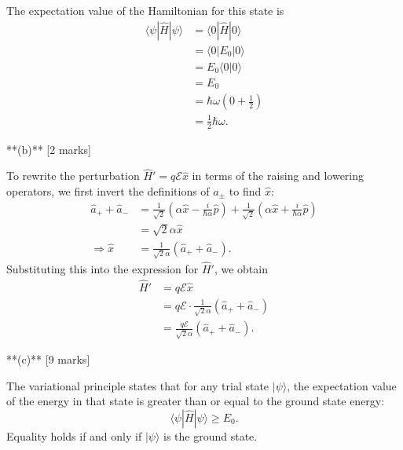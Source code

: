 \documentclass{article}
\begin{document}
The expectation value of the Hamiltonian for this state is
\begin{align*}
\langle \psi | \hat{H} | \psi \rangle &= \langle 0 | \hat{H} | 0 \rangle \\
&= \langle 0 | E_0 | 0 \rangle \\
&= E_0 \langle 0 | 0 \rangle \\
&= E_0 \\
&= \hbar \omega \left( 0 + \frac{1}{2} \right) \\
&= \frac{1}{2} \hbar \omega.
\end{align*}


**(b)** [2 marks]

To rewrite the perturbation \(\hat{H}' = q \mathcal{E} \hat{x}\) in terms of the raising and lowering operators, we first invert the definitions of \(\hat{a}_\pm\) to find \(\hat{x}\):
\begin{align*}
\hat{a}_+ + \hat{a}_- &= \frac{1}{\sqrt{2}} \left( \alpha \hat{x} - \frac{i}{\hbar \alpha} \hat{p} \right) + \frac{1}{\sqrt{2}} \left( \alpha \hat{x} + \frac{i}{\hbar \alpha} \hat{p} \right) \\
&= \sqrt{2} \alpha \hat{x} \\
\Rightarrow \hat{x} &= \frac{1}{\sqrt{2} \alpha} (\hat{a}_+ + \hat{a}_-).
\end{align*}
Substituting this into the expression for \(\hat{H}'\), we obtain
\begin{align*}
\hat{H}' &= q \mathcal{E} \hat{x} \\
&= q \mathcal{E} \cdot \frac{1}{\sqrt{2} \alpha} (\hat{a}_+ + \hat{a}_-) \\
&= \frac{q \mathcal{E}}{\sqrt{2} \alpha} (\hat{a}_+ + \hat{a}_-).
\end{align*}


**(c)** [9 marks]

The variational principle states that for any trial state \(|\psi\rangle\), the expectation value of the energy in that state is greater than or equal to the ground state energy:
\[
\langle \psi | \hat{H} | \psi \rangle \ge E_0.
\]
Equality holds if and only if \(|\psi\rangle\) is the ground state.
\end{document}
